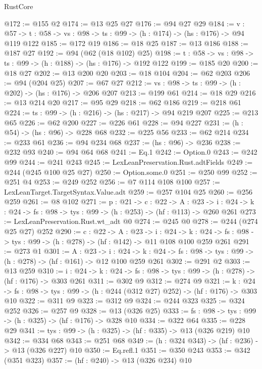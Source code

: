 \begin{lexlean}{RustCore}
\begin{coremodule}
@172 := @155 @2
@174 := @13 @25 @27
@176 := @94 @27 @29
@184 := {v : @57} ->
  {t : @58} -> {vs : @98} -> {ts : @99} -> (h : @174) -> (hs : @176) -> @94 @119 @122
@185 := @172 @19
@186 := @18 @25
@187 := @13 @186
@188 := @187 @27
@192 := @94 (@62 (@18 @102) @25)
@198 := {t : @58} -> {vs : @98} -> {ts : @99} -> (h : @188) -> (hs : @176) -> @192 @122
@199 := @185 @20
@200 := @18 @27
@202 := @13 @200 @20
@203 := @18 @104
@204 := @62 @203
@206 := @94 (@204 @25)
@207 := @67 @27
@212 := {vs : @98} -> {ts : @99} -> (h : @202) -> (hs : @176) -> @206 @207
@213 := @199 @61
@214 := @18 @29
@216 := @13 @214 @20
@217 := @95 @29
@218 := @62 @186
@219 := @218 @61
@224 := {ts : @99} -> (h : @216) -> (hs : @217) -> @94 @219 @207
@225 := @213 @65
@226 := @62 @200
@227 := @226 @61
@228 := @94 @227
@231 := (h : @54) -> (hs : @96) -> @228 @68
@232 := @225 @56
@233 := @62 @214
@234 := @233 @61
@236 := @94 @234 @68
@237 := (hs : @96) -> @236
@238 := @232 @93
@240 := @94 @64 @68
@241 := Eq.{1}
@242 := Option.{0}
@243 := @242 @99
@244 := @241 @243
@245 := LexLeanPreservation.Rust.adtFields
@249 := @244 (@245 @100 @25 @27)
@250 := Option.some.{0}
@251 := @250 @99
@252 := @251 @4
@253 := @249 @252
@256 := @7 @114 @108 @100
@257 := LexLeanTarget.TargetSyntax.Value.adt
@259 := @257 @104 @25
@260 := @256 @259
@261 := @8 @102
@271 := {p : @21} ->
  {c : @22} ->
  {A : @23} ->
  {i : @24} -> {k : @24} -> {fs : @98} -> {tys : @99} -> (h : @253) -> (hf : @113) -> @260 @261
@273 := LexLeanPreservation.Rust.wt_adt @0
@274 := @245 @0
@278 := @244 (@274 @25 @27) @252
@290 := {c : @22} ->
  {A : @23} ->
  {i : @24} ->
  {k : @24} -> {fs : @98} -> {tys : @99} -> (h : @278) -> (hf : @142) -> @11 @108 @100 @259 @261
@291 := @273 @1
@301 := {A : @23} ->
  {i : @24} ->
  {k : @24} -> {fs : @98} -> {tys : @99} -> (h : @278) -> (hf : @161) -> @12 @100 @259 @261
@302 := @291 @2
@303 := @13 @259
@310 := {i : @24} ->
  {k : @24} -> {fs : @98} -> {tys : @99} -> (h : @278) -> (hf : @176) -> @303 @261
@311 := @302 @9
@312 := @274 @9
@321 := {k : @24} ->
  {fs : @98} -> {tys : @99} -> (h : @244 (@312 @27) @252) -> (hf : @176) -> @303 @10
@322 := @311 @9
@323 := @312 @9
@324 := @244 @323
@325 := @324 @252
@326 := @257 @9
@328 := @13 (@326 @25)
@333 := {fs : @98} -> {tys : @99} -> (h : @325) -> (hf : @176) -> @328 @10
@334 := @322 @64
@335 := @228 @29
@341 := {tys : @99} -> (h : @325) -> (hf : @335) -> @13 (@326 @219) @10
@342 := @334 @68
@343 := @251 @68
@349 := (h : @324 @343) -> (hf : @236) -> @13 (@326 @227) @10
@350 := Eq.refl.{1}
@351 := @350 @243
@353 := @342 (@351 @323)
@357 := (hf : @240) -> @13 (@326 @234) @10

\end{coremodule}
\end{lexlean}

